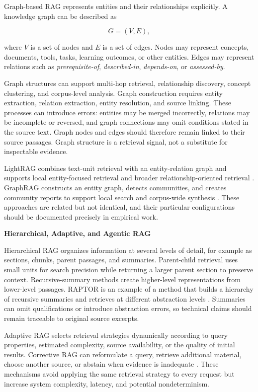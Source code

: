 \documentclass[12pt,a4paper]{report}
\numberwithin{equation}{chapter}
\begin{document}
Graph-based RAG represents entities and their relationships explicitly. A knowledge graph can be described as

\begin{equation}
\label{eq:graph}
G=(V,E),
\end{equation}

where \(V\) is a set of nodes and \(E\) is a set of edges. Nodes may represent concepts, documents, tools, tasks, learning outcomes, or other entities. Edges may represent relations such as \textit{prerequisite-of}, \textit{described-in}, \textit{depends-on}, or \textit{assessed-by}.

Graph structures can support multi-hop retrieval, relationship discovery, concept clustering, and corpus-level analysis. Graph construction requires entity extraction, relation extraction, entity resolution, and source linking. These processes can introduce errors: entities may be merged incorrectly, relations may be incomplete or reversed, and graph connections may omit conditions stated in the source text. Graph nodes and edges should therefore remain linked to their source passages. Graph structure is a retrieval signal, not a substitute for inspectable evidence.

LightRAG combines text-unit retrieval with an entity-relation graph and supports local entity-focused retrieval and broader relationship-oriented retrieval \cite{Guo2024}. GraphRAG constructs an entity graph, detects communities, and creates community reports to support local search and corpus-wide synthesis \cite{Edge2024}. These approaches are related but not identical, and their particular configurations should be documented precisely in empirical work.

\par\medskip
\textbf{Hierarchical, Adaptive, and Agentic RAG}

Hierarchical RAG organizes information at several levels of detail, for example as sections, chunks, parent passages, and summaries. Parent-child retrieval uses small units for search precision while returning a larger parent section to preserve context. Recursive-summary methods create higher-level representations from lower-level passages. RAPTOR is an example of a method that builds a hierarchy of recursive summaries and retrieves at different abstraction levels \cite{Sarthi2024}. Summaries can omit qualifications or introduce abstraction errors, so technical claims should remain traceable to original source excerpts.

Adaptive RAG selects retrieval strategies dynamically according to query properties, estimated complexity, source availability, or the quality of initial results. Corrective RAG can reformulate a query, retrieve additional material, choose another source, or abstain when evidence is inadequate \cite{Yan2024}. These mechanisms avoid applying the same retrieval strategy to every request but increase system complexity, latency, and potential nondeterminism.
\end{document}
